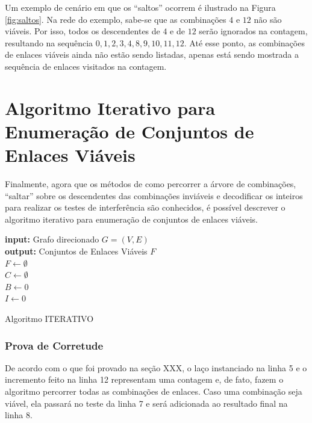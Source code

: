 Um exemplo de cenário em que os “saltos” ocorrem é ilustrado na Figura \ref{fig:saltos}. Na rede do exemplo, sabe-se que as combinações $4$ e $12$ não são viáveis. Por isso, todos os descendentes de $4$ e de $12$ serão ignorados na contagem, resultando na sequência $0, 1, 2, 3, 4, 8, 9, 10, 11, 12$. Até esse ponto, as combinações de enlaces viáveis ainda não estão sendo listadas, apenas está sendo mostrada a sequência de enlaces visitados na contagem.

\section{Algoritmo Iterativo para Enumeração de Conjuntos de Enlaces Viáveis}

Finalmente, agora que os métodos de como percorrer a árvore de combinações, “saltar” sobre os descendentes das combinações inviáveis e decodificar os inteiros para realizar os testes de interferência são conhecidos, é possível descrever o algoritmo iterativo para enumeração de conjuntos de enlaces viáveis.

\begin{algorithm}[h]
	\SetVline
	{\bf input:} Grafo direcionado $G=(V,E)$\\
	{\bf output:} Conjuntos de Enlaces Viáveis $F$\\
	$F \leftarrow \emptyset$\\
	$C \leftarrow \emptyset$\\
	$B \leftarrow 0$\\
	$I \leftarrow 0$\\
\caption{Algoritmo ITERATIVO}
\label{alg:iterativo}
\end{algorithm}

\subsubsection{Prova de Corretude}

De acordo com o que foi provado na seção XXX, o laço instanciado na linha 5 e o incremento feito na linha 12 representam uma contagem e, de fato, fazem o algoritmo percorrer todas as combinações de enlaces. Caso uma combinação seja viável, ela passará no teste da linha 7 e será adicionada ao resultado final na linha 8.

